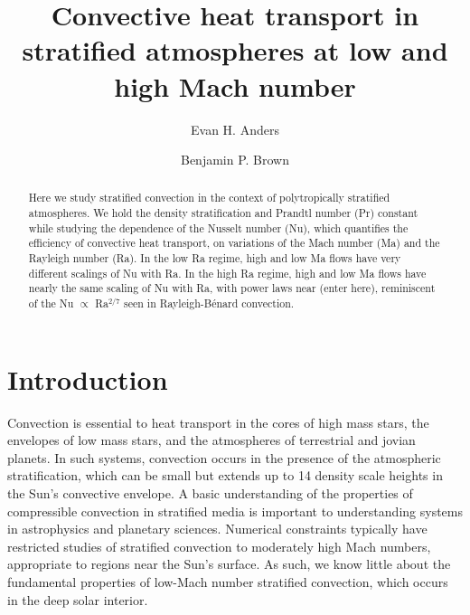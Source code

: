 \documentclass[aps, prl, twocolumn, groupedaddress, amsfonts, amssymb, amsmath]{revtex4-1}
\newcommand{\RB}{Rayleigh-B\'{e}nard }
\begin{document}
\author{Evan H. Anders}
\author{Benjamin P. Brown}
\title{Convective heat transport in stratified atmospheres at low and high Mach number}

\begin{abstract}
Here we study stratified convection in the context of polytropically stratified atmospheres. 
We hold the density stratification and Prandtl number (Pr) constant while studying the dependence
of the Nusselt number (Nu), which quantifies the efficiency of convective heat transport, on
variations of the Mach number (Ma) and the Rayleigh number (Ra).  In the low Ra regime, high and
low Ma flows have very different scalings of Nu with Ra.  In the high Ra regime, high and low Ma flows
have nearly the same scaling of Nu with Ra, with power laws near (enter here), reminiscent of the
Nu $\propto$ Ra$^{2/7}$ seen in \RB convection.
\end{abstract}
\maketitle


\section{Introduction}
\label{sec:intro}
Convection is essential to heat transport in the cores of high mass stars, the
envelopes of low mass stars, and the atmospheres of terrestrial and jovian planets. In such systems, convection
occurs in the presence of the atmospheric stratification, which can be small but extends up to 
14 density scale heights in the Sun's convective envelope.
A basic understanding of the
properties of compressible convection in stratified media is important to understanding systems in astrophysics
and planetary sciences.  Numerical constraints typically have restricted studies of stratified convection to
moderately high Mach numbers, appropriate to regions near the Sun's surface.  As such, we know little about the
fundamental properties of low-Mach number stratified convection, which occurs in the deep solar interior.
\end{document}
